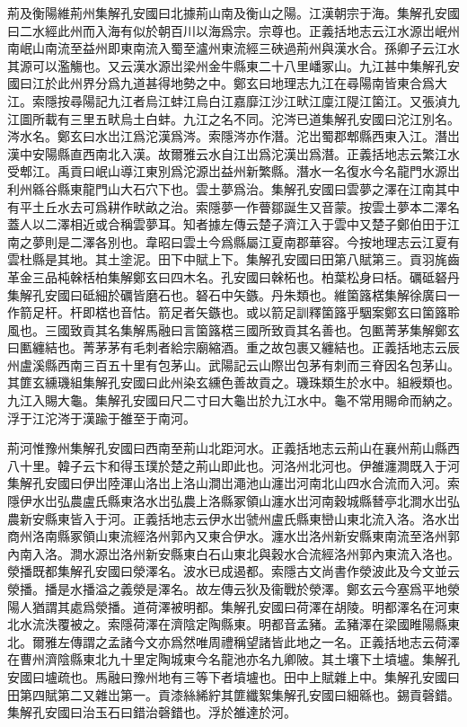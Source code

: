 荊及衡陽維荊州集解孔安國曰北據荊山南及衡山之陽。江漢朝宗于海。集解孔安國曰二水經此州而入海有似於朝百川以海爲宗。宗尊也。正義括地志云江水源岀岷州南岷山南流至益州即東南流入蜀至瀘州東流經三硤過荊州與漢水合。孫卿子云江水其源可以濫觴也。又云漢水源岀梁州金牛縣東二十八里嶓冢山。九江甚中集解孔安國曰江於此州界分爲九道甚得地勢之中。鄭玄曰地理志九江在尋陽南皆東合爲大江。索隱按尋陽記九江者烏江蚌江烏白江嘉靡江沙江畎江廩江隄江箘江。又張湞九江圖所載有三里五畎烏土白蚌。九江之名不同。沱涔已道集解孔安國曰沱江別名。涔水名。鄭玄曰水岀江爲沱漢爲涔。索隱涔亦作潛。沱岀蜀郡郫縣西東入江。潛岀漢中安陽縣直西南北入漢。故爾雅云水自江岀爲沱漢岀爲潛。正義括地志云繁江水受郫江。禹貢曰岷山導江東別爲沱源岀益州新繁縣。潛水一名復水今名龍門水源岀利州緜谷縣東龍門山大石穴下也。雲土夢爲治。集解孔安國曰雲夢之澤在江南其中有平土丘水去可爲耕作畎畝之治。索隱夢一作瞢鄒誕生又音蒙。按雲土夢本二澤名蓋人以二澤相近或合稱雲夢耳。知者據左傳云楚子濟江入于雲中又楚子鄭伯田于江南之夢則是二澤各別也。韋昭曰雲土今爲縣屬江夏南郡華容。今按地理志云江夏有雲杜縣是其地。其土塗泥。田下中賦上下。集解孔安國曰田第八賦第三。貢羽旄齒革金三品杶榦栝柏集解鄭玄曰四木名。孔安國曰榦柘也。柏葉松身曰栝。礪砥砮丹集解孔安國曰砥細於礪皆磨石也。砮石中矢鏃。丹朱類也。維箘簬楛集解徐廣曰一作箭足杆。杆即楛也音怙。箭足者矢鏃也。或以箭足訓釋箘簬乎駰案鄭玄曰箘簬聆風也。三國致貢其名集解馬融曰言箘簬楛三國所致貢其名善也。包匭菁茅集解鄭玄曰匭纏結也。菁茅茅有毛刺者給宗廟縮酒。重之故包裹又纏結也。正義括地志云辰州盧溪縣西南三百五十里有包茅山。武陽記云山際岀包茅有刺而三脊因名包茅山。其篚玄纁璣組集解孔安國曰此州染玄纁色善故貢之。璣珠類生於水中。組綬類也。九江入賜大龜。集解孔安國曰尺二寸曰大龜岀於九江水中。龜不常用賜命而納之。浮于江沱涔于漢踰于雒至于南河。

荊河惟豫州集解孔安國曰西南至荊山北距河水。正義括地志云荊山在襄州荊山縣西八十里。韓子云卞和得玉璞於楚之荊山即此也。河洛州北河也。伊雒瀍澗既入于河集解孔安國曰伊岀陸渾山洛岀上洛山澗岀澠池山瀍岀河南北山四水合流而入河。索隱伊水岀弘農盧氏縣東洛水岀弘農上洛縣冢領山瀍水岀河南穀城縣朁亭北澗水岀弘農新安縣東皆入于河。正義括地志云伊水岀虢州盧氏縣東巒山東北流入洛。洛水岀商州洛南縣冢領山東流經洛州郭內又東合伊水。瀍水岀洛州新安縣東南流至洛州郭內南入洛。澗水源岀洛州新安縣東白石山東北與穀水合流經洛州郭內東流入洛也。滎播既都集解孔安國曰滎澤名。波水已成遏都。索隱古文尚書作滎波此及今文並云滎播。播是水播溢之義滎是澤名。故左傳云狄及衞戰於滎澤。鄭玄云今塞爲平地滎陽人猶謂其處爲滎播。道荷澤被明都。集解孔安國曰荷澤在胡陵。明都澤名在河東北水流泆覆被之。索隱荷澤在濟陰定陶縣東。明都音孟豬。孟豬澤在梁國睢陽縣東北。爾雅左傳謂之孟諸今文亦爲然唯周禮稱望諸皆此地之一名。正義括地志云荷澤在曹州濟陰縣東北九十里定陶城東今名龍池亦名九卿陂。其土壤下土墳壚。集解孔安國曰壚疏也。馬融曰豫州地有三等下者墳壚也。田中上賦雜上中。集解孔安國曰田第四賦第二又雜岀第一。貢漆絲絺紵其篚纖絮集解孔安國曰細緜也。錫貢磬錯。集解孔安國曰治玉石曰錯治磬錯也。浮於雒達於河。

